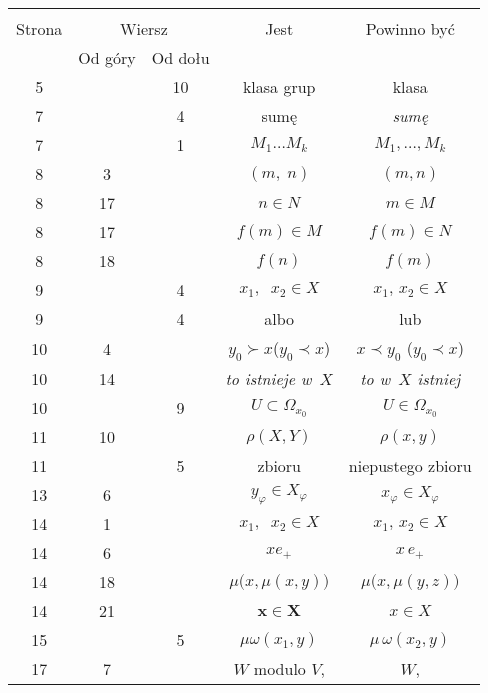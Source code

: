 \documentclass[a4paper,11pt]{article}
\begin{document}
\begin{center}

  \begin{tabular}{|c|c|c|c|c|}
    \hline
    & \multicolumn{2}{c|}{} & & \\
    Strona & \multicolumn{2}{c|}{Wiersz} & Jest
                              & Powinno być \\ \cline{2-3}
    & Od góry & Od dołu & & \\
    \hline
    5   & & 10 & klasa grup & klasa \\
    7   & &  4 & sumę & \textit{sumę} \\
    7   & &  1 & $M_{ 1 } \ldots M_{ k }$ & $M_{ 1 }, \ldots, M_{ k }$ \\
    8   &  3 & & $( m,\; n )$ & $( m, n )$ \\
    8   & 17 & & $n \in N$ & $m \in M$ \\
    8   & 17 & & $f( m ) \in M$ & $f( m ) \in N$ \\
    8   & 18 & & $f( n )$ & $f( m )$ \\
    9   & &  4 & $x_{ 1 },\;\; x_{ 2 } \in X$ & $x_{ 1 },\, x_{ 2 } \in X$ \\
    9   & &  4 & albo & lub \\
    10  &  4 & & $y_{ 0 } \succ x$($y_{ 0 } \prec x$)
           & $x \prec y_{ 0 }$ ($y_{ 0 } \prec x$) \\
    10  & 14 & & \textit{to istnieje w~$X$} & \textit{to w~$X$ istniej} \\
    10  & &  9 & $U \subset \Omega_{ x_{ 0 } }$ & $U \in \Omega_{ x_{ 0 } }$ \\
    11  & 10 & & $\rho( X, Y )$ & $\rho( x, y )$ \\
    11  & &  5 & zbioru & niepustego zbioru \\
    13  &  6 & & $y_{ \varphi } \in X_{ \varphi }$ & $x_{ \varphi } \in X_{ \varphi }$ \\
    14  &  1 & & $x_{ 1 },\;\; x_{ 2 } \in X$ & $x_{ 1 },\, x_{ 2 } \in X$ \\
    14  &  6 & & $x e_{ + }$ & $x \, e_{ + }$ \\
    14  & 18 & & $\mu\big( x, \mu( x, y ) \big)$
           & $\mu\big( x, \mu( y, z ) \big)$ \\
    14  & 21 & & $\mathbf{x} \in \mathbf{X}$ & $x \in X$ \\
    15  & &  5 & $\mu \omega( x_{ 1 }, y )$ & $\mu \, \omega( x_{ 2 }, y )$ \\
    17  &  7 & & $W$ modulo $V$, & $W$, \\

\end{tabular}
\end{center}
\end{document}
